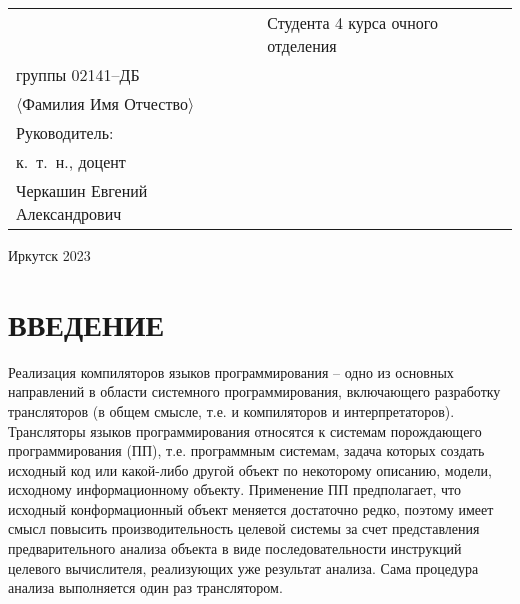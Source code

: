 \documentclass[732]{studrep}
\begin{document}
\vfill
\noindent\begin{tabularx}{\textwidth} {
  >{\raggedright\arraybackslash}X
  >{\raggedright}X }
&
Студента 4 курса очного отделения\\
группы 02141--ДБ\\
$\langle{}$Фамилия Имя Отчество$\rangle$\\[1em]

Руководитель:\\ %
к.~т.~н., доцент\\[0.5em]
\underline{\hspace{3cm}} Черкашин Евгений Александрович


\end{tabularx}
\vfill
\begin{center}
  Иркутск 2023
\end{center}
\clearpage

\tableofcontents

\chapter*{ВВЕДЕНИЕ}
\label{chap:intro}

Реализация компиляторов языков программирования -- одно из основных направлений в области системного программирования, включающего разработку трансляторов (в общем смысле, т.е. и компиляторов и интерпретаторов).  Трансляторы языков программирования относятся к системам порождающего программирования (ПП), т.е. программным системам, задача которых создать исходный код или какой-либо другой объект по некоторому описанию, модели, исходному информационному объекту.  Применение ПП предполагает, что исходный конформационный объект меняется достаточно редко, поэтому имеет смысл повысить производительность целевой системы за счет представления предварительного анализа объекта в виде последовательности инструкций целевого вычислителя, реализующих уже результат анализа.  Сама процедура анализа выполняется один раз транслятором.
\end{document}
